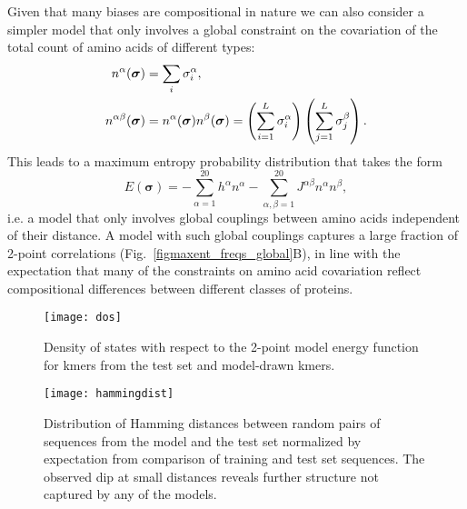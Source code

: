 Given that many biases are compositional in nature we can also consider a simpler model that only involves a global constraint on the covariation of the total count of amino acids of different types:
\begin{align}
    n^\alpha(\boldsymbol \sigma) &= \sum_i \sigma_i^\alpha, \\
    n^{\alpha\beta}(\boldsymbol \sigma) &= n^\alpha(\boldsymbol \sigma) n^\beta(\boldsymbol\sigma) = \left(\sum_{i=1}^L \sigma_i^\alpha\right) \left(\sum_{j=1}^L \sigma_j^\beta\right).
\end{align}
This leads to a maximum entropy probability distribution that takes the form
\begin{equation}
    E(\boldsymbol \sigma) = - \sum_{\alpha=1}^{20} h^\alpha n^\alpha -  \sum_{\alpha,\beta = 1}^{20} J^{\alpha \beta} n^\alpha n^\beta,
\end{equation}
i.e. a model that only involves global couplings between amino acids independent of their distance.
A model with such global couplings captures a large fraction of 2-point correlations (Fig.~\ref{figmaxent_freqs_global}B), in line with the expectation that many of the constraints on amino acid covariation reflect compositional differences between different classes of proteins.


\begin{figure*}
    \texttt{[image: dos]}
    \caption{Density of states with respect to the 2-point model energy function for kmers from the test set and model-drawn kmers.
    \label{figdos}
    }
\end{figure*}

\begin{figure}
    \texttt{[image: hammingdist]}
    \caption{Distribution of Hamming distances between random pairs of sequences from the model and the test set normalized by expectation from comparison of training and test set sequences. The observed dip at small distances reveals further structure not captured by any of the models.
    \label{fighammingdist}
    }
\end{figure}



